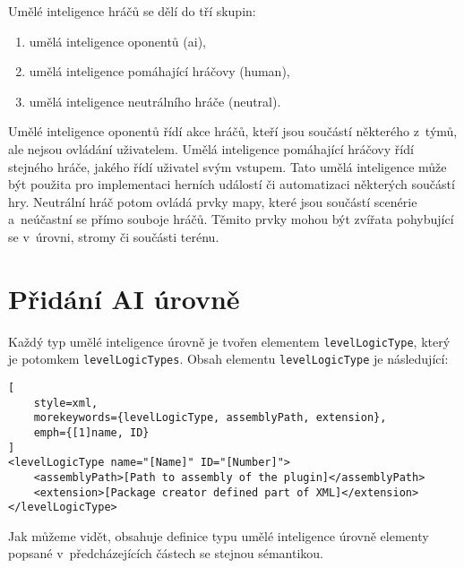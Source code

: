 Umělé inteligence hráčů se dělí do tří skupin:
\begin{enumerate}
	\item umělá inteligence oponentů (ai),
	\item umělá inteligence pomáhající hráčovy (human),
	\item umělá inteligence neutrálního hráče (neutral).
\end{enumerate}

Umělé inteligence oponentů řídí akce hráčů, kteří jsou součástí některého z~týmů, ale nejsou ovládání uživatelem. Umělá inteligence pomáhající hráčovy řídí stejného hráče, jakého řídí uživatel svým vstupem. Tato umělá inteligence může být použita pro implementaci herních událostí či automatizaci některých součástí hry. Neutrální hráč potom ovládá prvky mapy, které jsou součástí scenérie a~neúčastní se přímo souboje hráčů. Těmito prvky mohou být zvířata pohybující se v~úrovni, stromy či součásti terénu. 

\section{Přidání AI úrovně}
Každý typ umělé inteligence úrovně je tvořen elementem \texttt{levelLogicType}, který je potomkem \texttt{levelLogicTypes}. Obsah elementu \texttt{levelLogicType} je následující:

\begin{lstlisting}[
	style=xml,
	morekeywords={levelLogicType, assemblyPath, extension},
	emph={[1]name, ID}
]
<levelLogicType name="[Name]" ID="[Number]">
	<assemblyPath>[Path to assembly of the plugin]</assemblyPath>
	<extension>[Package creator defined part of XML]</extension>
</levelLogicType>
\end{lstlisting}
Jak můžeme vidět, obsahuje definice typu umělé inteligence úrovně elementy popsané v~předcházejících částech se stejnou sémantikou.


